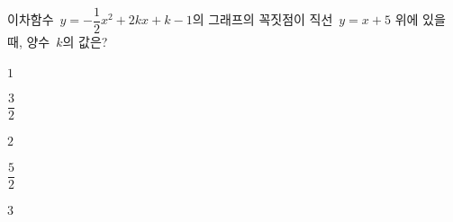 이차함수~$y=-\dfrac{1}{2}x^2+2kx+k-1$의 그래프의 꼭짓점이 직선~$y=x+5$ 위에 있을 때, 양수~$k$의 값은?
\begin{choices32}{\rule[-3ex]{0pt}{8ex}$1$}{\rule[-3ex]{0pt}{8ex}$\dfrac{3}{2}$}{\rule[-3ex]{0pt}{8ex}$2$}{\rule[-3ex]{0pt}{8ex}$\dfrac{5}{2}$}{\rule[-3ex]{0pt}{8ex}$3$}\end{choices32}
